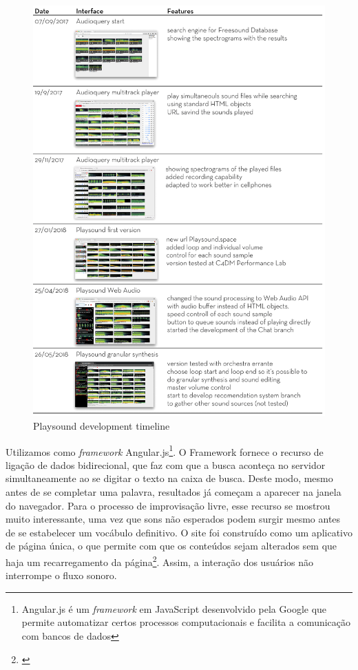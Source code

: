 \begin{figure}

\includegraphics[width=1\textwidth]{pictures/playsoundtimeline}
\caption{\label{pstimeline}Playsound development timeline}
\label{fig:timeline}
\end{figure}

Utilizamos como \emph{framework} Angular.js\footnote{Angular.js é um \emph{framework} em JavaScript desenvolvido pela Google que permite automatizar certos processos computacionais e facilita a comunicação com bancos de dados}. O Framework fornece o recurso de ligação de dados bidirecional, que faz com que a busca aconteça no servidor simultaneamente ao se digitar o texto na caixa de busca. Deste modo, mesmo antes de se completar uma palavra, resultados já começam a aparecer na janela do navegador. Para o processo de improvisação livre, esse recurso se mostrou muito interessante, uma vez que sons não esperados podem surgir mesmo antes de se estabelecer um vocábulo definitivo. O site foi construído como um aplicativo de página única, o que permite com que os conteúdos sejam alterados sem que haja um recarregamento da página\footnote{\cite{Jadhav}}. Assim, a interação dos usuários não interrompe o fluxo sonoro.

